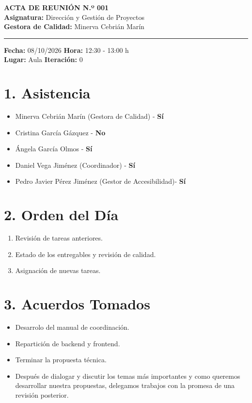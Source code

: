 
\begin{center}
    {\Large \textbf{ACTA DE REUNIÓN N.º 001}}\\[0.2cm]
    \textbf{Asignatura:} Dirección y Gestión de Proyectos\\
    \textbf{Gestora de Calidad:} Minerva Cebrián Marín
\end{center}

\vspace{0.3cm}
\hrule
\vspace{0.4cm}

\noindent \textbf{Fecha:} 08/10/2026 \hfill \textbf{Hora:} 12:30 - 13:00 h\\
\noindent \textbf{Lugar:} Aula  \hfill \textbf{Iteración:} 0

\vspace{0.4cm}

\section*{1. Asistencia}
\begin{itemize}
    \item Minerva Cebrián Marín (Gestora de Calidad) - \textbf{Sí}
    \item Cristina García Gázquez  - \textbf{No}
    \item Ángela García Olmos  - \textbf{Sí}
    \item Daniel Vega Jiménez (Coordinador) - \textbf{Sí}
    \item Pedro Javier Pérez Jiménez (Gestor de Accesibilidad)- \textbf{Sí}
\end{itemize}



\section*{2. Orden del Día}
\begin{enumerate}
    \item Revisión de tareas anteriores.
    \item Estado de los entregables y revisión de calidad.
    \item Asignación de nuevas tareas.
\end{enumerate}

\section*{3. Acuerdos Tomados}
\begin{itemize}
    \item Desarrolo del manual de coordinación.
    \item Repartición de backend y frontend.
    \item Terminar la propuesta técnica.
    \item Después de dialogar y discutir los temas más importantes y como queremos desarrollar nuestra propuestas, delegamos trabajos con la promesa de una revisión posterior.
\end{itemize}

